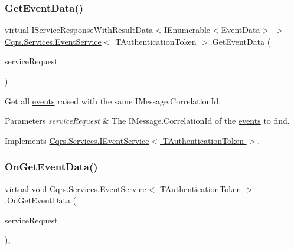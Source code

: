 \subsubsection{\texorpdfstring{Get\+Event\+Data()}{GetEventData()}}
{\footnotesize\ttfamily virtual \hyperlink{interfaceCqrs_1_1Services_1_1IServiceResponseWithResultData}{I\+Service\+Response\+With\+Result\+Data}$<$I\+Enumerable$<$\hyperlink{classCqrs_1_1Events_1_1EventData}{Event\+Data}$>$ $>$ \hyperlink{classCqrs_1_1Services_1_1EventService}{Cqrs.\+Services.\+Event\+Service}$<$ T\+Authentication\+Token $>$.Get\+Event\+Data (\begin{DoxyParamCaption}\item[{\hyperlink{interfaceCqrs_1_1Services_1_1IServiceRequestWithData}{I\+Service\+Request\+With\+Data}$<$ T\+Authentication\+Token, Guid $>$}]{service\+Request }\end{DoxyParamCaption})\hspace{0.3cm}{\ttfamily [virtual]}}



Get all \hyperlink{}{events} raised with the same I\+Message.\+Correlation\+Id. 


\begin{DoxyParams}{Parameters}
{\em service\+Request} & The I\+Message.\+Correlation\+Id of the \hyperlink{}{events} to find.\\
\hline
\end{DoxyParams}


Implements \hyperlink{interfaceCqrs_1_1Services_1_1IEventService_aa41b82bc398bfab0b2fd519d7f067946_aa41b82bc398bfab0b2fd519d7f067946}{Cqrs.\+Services.\+I\+Event\+Service$<$ T\+Authentication\+Token $>$}.

\mbox{\label{classCqrs_1_1Services_1_1EventService_a1556310c97fbf05df7804d53f91f8511_a1556310c97fbf05df7804d53f91f8511}} 
\subsubsection{\texorpdfstring{On\+Get\+Event\+Data()}{OnGetEventData()}}
{\footnotesize\ttfamily virtual void \hyperlink{classCqrs_1_1Services_1_1EventService}{Cqrs.\+Services.\+Event\+Service}$<$ T\+Authentication\+Token $>$.On\+Get\+Event\+Data (\begin{DoxyParamCaption}\item[{\hyperlink{interfaceCqrs_1_1Services_1_1IServiceRequestWithData}{I\+Service\+Request\+With\+Data}$<$ T\+Authentication\+Token, Guid $>$}]{service\+Request }\end{DoxyParamCaption})\hspace{0.3cm}{\ttfamily [protected]}, {\ttfamily [virtual]}}



